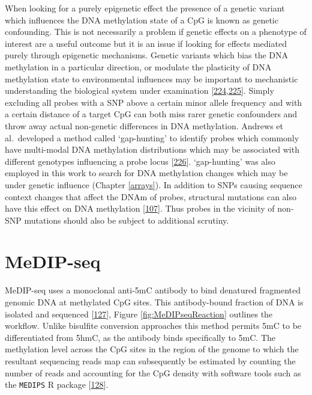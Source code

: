 \documentclass[
]{book}
\begin{document}
When looking for a purely epigenetic effect the presence of a genetic variant which influences the DNA methylation state of a CpG is known as genetic confounding.
This is not necessarily a problem if genetic effects on a phenotype of interest are a useful outcome but it is an issue if looking for effects mediated purely through epigenetic mechanisms.
Genetic variants which bias the DNA methylation in a particular direction, or modulate the plasticity of DNA methylation state to environmental influences may be important to mechanistic understanding the biological system under examination {[}\protect\hyperlink{ref-Birney2016}{224},\protect\hyperlink{ref-Lappalainen2017}{225}{]}.
Simply excluding all probes with a SNP above a certain minor allele frequency and with a certain distance of a target CpG can both miss rarer genetic confounders and throw away actual non-genetic differences in DNA methylation.
Andrews et al.~developed a method called `gap-hunting' to identify probes which commonly have multi-modal DNA methylation distributions which may be associated with different genotypes influencing a probe locus {[}\protect\hyperlink{ref-Andrews2016}{226}{]}.
`gap-hunting' was also employed in this work to search for DNA methylation changes which may be under genetic influence (Chapter \ref{arrays}).
In addition to SNPs causing sequence context changes that affect the DNAm of probes, structural mutations can also have this effect on DNA methylation {[}\protect\hyperlink{ref-Bell2017a}{107}{]}.
Thus probes in the vicinity of non-SNP mutations should also be subject to additional scrutiny.

\hypertarget{MeDIPseq}{%
\section{MeDIP-seq}\label{MeDIPseq}}

MeDIP-seq uses a monoclonal anti-5mC antibody to bind denatured fragmented genomic DNA at methylated CpG sites.
This antibody-bound fraction of DNA is isolated and sequenced {[}\protect\hyperlink{ref-Down2009}{127}{]}, Figure \ref{fig:MeDIPseqReaction} outlines the workflow.
Unlike bisulfite conversion approaches this method permits 5mC to be differentiated from 5hmC, as the antibody binds specifically to 5mC.
The methylation level across the CpG sites in the region of the genome to which the resultant sequencing reads map can subsequently be estimated by counting the number of reads and accounting for the CpG density with software tools such as the \texttt{MEDIPS} R package {[}\protect\hyperlink{ref-Lienhard2014}{128}{]}.
\end{document}

